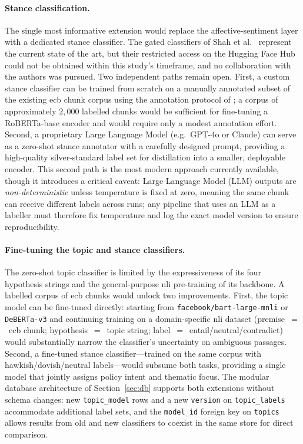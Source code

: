 \paragraph{Stance classification.} The single most informative extension would replace the affective-sentiment layer with a dedicated stance classifier. The gated classifiers of Shah et al.\ \cite{shah2023trillion, shah2025wcb} represent the current state of the art, but their restricted access on the Hugging Face Hub could not be obtained within this study's timeframe, and no collaboration with the authors was pursued. Two independent paths remain open. First, a custom stance classifier can be trained from scratch on a manually annotated subset of the existing \gls{ecb} chunk corpus using the annotation protocol of \cite{shah2023trillion}; a corpus of approximately $2{,}000$ labelled chunks would be sufficient for fine-tuning a RoBERTa-base encoder and would require only a modest annotation effort. Second, a proprietary Large Language Model (e.g.\ GPT-4o or Claude) can serve as a zero-shot stance annotator with a carefully designed prompt, providing a high-quality silver-standard label set for distillation into a smaller, deployable encoder. This second path is the most modern approach currently available, though it introduces a critical caveat: Large Language Model (LLM) outputs are \emph{non-deterministic} unless temperature is fixed at zero, meaning the same chunk can receive different labels across runs; any pipeline that uses an LLM as a labeller must therefore fix temperature and log the exact model version to ensure reproducibility.

\paragraph{Fine-tuning the topic and stance classifiers.} The zero-shot topic classifier is limited by the expressiveness of its four hypothesis strings and the general-purpose \gls{nli} pre-training of its backbone. A labelled corpus of \gls{ecb} chunks would unlock two improvements. First, the topic model can be fine-tuned directly: starting from
\texttt{facebook/bart-large-mnli} or \texttt{DeBERTa-v3} and continuing training on a domain-specific \gls{nli} dataset (premise~$=$~\gls{ecb} chunk; hypothesis~$=$~topic string; label~$=$~entail/neutral/contradict) would substantially narrow the classifier's uncertainty on ambiguous passages. Second, a fine-tuned stance classifier---trained on the same corpus with hawkish/dovish/neutral labels---would subsume both tasks, providing a single model that jointly assigns policy intent and thematic focus. The modular database architecture of Section~\ref{sec:db} supports both extensions without schema changes: new \texttt{topic\_model} rows and a new \texttt{version} on \texttt{topic\_labels} accommodate additional label sets, and the
\texttt{model\_id} foreign key on \texttt{topics} allows results from old and new classifiers to coexist in the same store for direct comparison.

